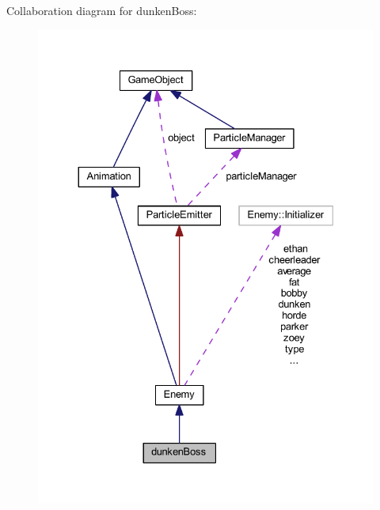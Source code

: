 Collaboration diagram for dunken\+Boss\+:\nopagebreak
\begin{figure}[H]
\begin{center}
\leavevmode
\includegraphics[width=330pt]{classdunken_boss__coll__graph}
\end{center}
\end{figure}
